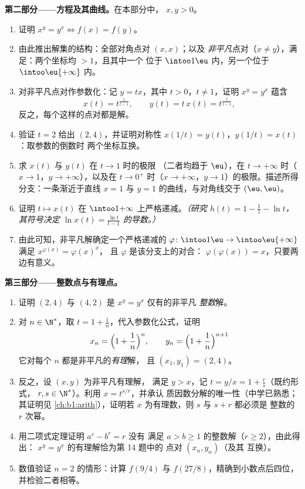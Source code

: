 \begin{problem}
\medskip
\noindent\textbf{第二部分——方程及其曲线。}在本部分中，
$x, y > 0$。
\begin{enumerate}[resume]
  \item 证明 $x^y = y^x \iff f(x) = f(y)$。
  \item 由此推出解集的结构：全部对角点对 $(x, x)$；以及
        \emph{非平凡}点对（$x \neq
        y$），满足：两个坐标均 $> 1$，且其中一个
        位于 $\intoo1\eu$ 内，另一个位于
        $\intoo\eu{+\infty}$ 内。
  \item 对非平凡点对作参数化：记 $y = tx$，其中 $t
        > 0$，$t \neq 1$，证明 $x^y = y^x$ 蕴含
        \[
        x(t) = t^{\frac1{t-1}},
        \qquad
        y(t) = t\,x(t) = t^{\frac{t}{t-1}},
        \]
        反之，每个这样的点对都是解。
  \item 验证 $t = 2$ 给出 $(2, 4)$，并证明对称性
        $x(1/t) = y(t)$，$y(1/t) = x(t)$：取参数的倒数时
        两个坐标互换。
  \item 求 $x(t)$ 与 $y(t)$ 在 $t \to 1$ 时的极限
        （二者均趋于 $\eu$），在 $t \to +\infty$ 时（$x \to 1$，$y
        \to +\infty$），以及在 $t \to 0^+$ 时（$x \to +\infty$，$y \to
        1$）的极限。描述所得分支：一条渐近于直线
        $x = 1$ 与 $y = 1$ 的曲线，与对角线交于
        $(\eu, \eu)$。
  \item 证明 $t \mapsto x(t)$ 在
        $\intoo1{+\infty}$ 上严格递减。\emph{（研究 $h(t) = 1 - \frac1t - \ln
        t$，其符号决定 $\ln x(t) =
        \frac{\ln t}{t - 1}$ 的导数。）}
  \item 由此可知，非平凡解确定一个严格递减的
        $\varphi \colon \intoo1\eu \to
        \intoo\eu{+\infty}$ 满足 $x^{\varphi(x)} = \varphi(x)^x$，
        且 $\varphi$ 是该分支上的对合：
        $\varphi(\varphi(x)) = x$，只要两边有意义。
\end{enumerate}

\medskip
\noindent\textbf{第三部分——整数点与有理点。}
\begin{enumerate}[resume]
  \item 证明 $(2, 4)$ 与 $(4, 2)$ 是 $x^y = y^x$ 仅有的非平凡
        \emph{整数}解。
  \item 对 $n \in \N^*$，取 $t = 1 +
        \frac1n$，代入参数化公式，证明
        \[
        x_n = \Bigl(1 + \frac1n\Bigr)^{n},
        \qquad
        y_n = \Bigl(1 + \frac1n\Bigr)^{n+1}
        \]
        它对每个 $n$ 都是非平凡的\emph{有理}解，
        且 $(x_1, y_1) = (2, 4)$。
  \item 反之，设 $(x, y)$ 为非平凡有理解，
        满足 $y > x$，记 $t = y/x = 1 + \frac rs$（既约形式，
        $r, s \in \N^*$）。利用 $x = t^{s/r}$，并承认
        质因数分解的唯一性（中学已熟悉；
        其证明见 \cref{ch:b1:arith}），证明若 $x$
        为有理数，则 $s$ 与 $s + r$ 都必须是
        整数的 $r$ 次幂。
  \item 用二项式定理证明 $a^r - b^r = r$ 没有
        满足 $a > b \geq 1$ 的整数解（$r \geq 2$），由此得出：
        $x^y = y^x$ 的有理解恰为第 14 题中的
        点对 $(x_n, y_n)$（及其
        互换）。
  \item 数值验证 $n = 2$ 的情形：计算 $f(9/4)$ 与
        $f(27/8)$，精确到小数点后四位，并检验二者相等。
\end{enumerate}


\end{problem}
